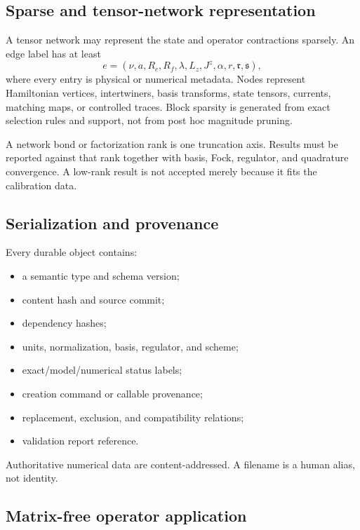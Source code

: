 \documentclass[11pt]{article}
\begin{document}
\subsection{Sparse and tensor-network representation}

A tensor network may represent the state and operator contractions sparsely.
An edge label has at least
\begin{equation}
 e=(\nu,a,R_c,R_f,\lambda,L_z,J^z,
 \alpha,r,\mathfrak r,\mathfrak s),
\label{eq:network-edge}
\end{equation}
where every entry is physical or numerical metadata.  Nodes represent
Hamiltonian vertices, intertwiners, basis transforms, state tensors, currents,
matching maps, or controlled traces.  Block sparsity is generated from exact
selection rules and support, not from post hoc magnitude pruning.

A network bond or factorization rank is one truncation axis.  Results must be
reported against that rank together with basis, Fock, regulator, and
quadrature convergence.  A low-rank result is not accepted merely because it
fits the calibration data.

\subsection{Serialization and provenance}

Every durable object contains:
\begin{itemize}
\item a semantic type and schema version;
\item content hash and source commit;
\item dependency hashes;
\item units, normalization, basis, regulator, and scheme;
\item exact/model/numerical status labels;
\item creation command or callable provenance;
\item replacement, exclusion, and compatibility relations;
\item validation report reference.
\end{itemize}
Authoritative numerical data are content-addressed.  A filename is a human
alias, not identity.

\subsection{Matrix-free operator application}
\end{document}

